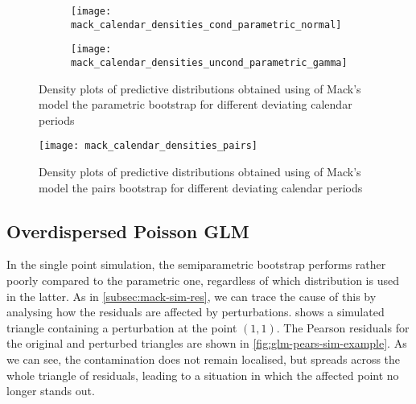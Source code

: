 \documentclass[a4paper]{book}
\begin{document}
\begin{landscape}
  \begin{figure}
    \begin{subfigure}{0.5\linewidth}
      \centering
      \texttt{[image: mack\_calendar\_densities\_cond\_parametric\_normal]}
      \label{fig:mack-calendar-cond-param-normal}
    \end{subfigure}
    \begin{subfigure}{0.5\linewidth}
      \centering
      \texttt{[image: mack\_calendar\_densities\_uncond\_parametric\_gamma]}
      \label{fig:mack-calendar-uncond-param-gamma}
    \end{subfigure}
    \caption{Density plots of predictive distributions obtained using of Mack's model the parametric bootstrap for different deviating calendar periods}
  \end{figure}
\end{landscape}

\begin{landscape}
  \begin{figure}
    \centering
    \texttt{[image: mack\_calendar\_densities\_pairs]}
    \caption{Density plots of predictive distributions obtained using of Mack's model the pairs bootstrap for different deviating calendar periods}
    \label{fig:mack-calendar-pairs}
  \end{figure}
\end{landscape}

\subsection{Overdispersed Poisson GLM}

In the single point simulation, the semiparametric bootstrap performs rather poorly compared to the parametric one, regardless of which distribution is used in the latter. As in \cref{subsec:mack-sim-res}, we can trace the cause of this by analysing how the residuals are affected by perturbations.  shows a simulated triangle containing a perturbation at the point $(1, 1)$. The Pearson residuals for the original and perturbed triangles are shown in \cref{fig:glm-pears-sim-example}. As we can see, the contamination does not remain localised, but spreads across the whole triangle of residuals, leading to a situation in which the affected point no longer stands out.
\end{document}
